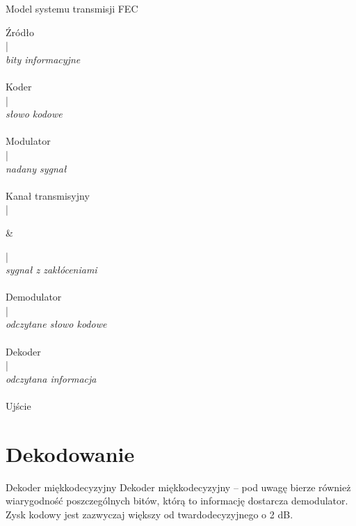 \documentclass[12pt]{beamer}
\begin{document}
\begin{frame}{Model systemu transmisji FEC}
\centering

\begin{minipage}[t]{100pt}{
\centering
Źródło\\|\\ \emph{bity informacyjne}\\ \downarrow\\  Koder\\|\\ \emph{słowo kodowe}\\ \downarrow\\ Modulator\\|\\ \emph{nadany sygnał}\\ \downarrow\\ Kanał transmisyjny\\|\\ }
\end{minipage}
&
\begin{minipage}[t]{100pt}
\centering
|\\
\emph{sygnał z zakłóceniami} \\\downarrow\\
Demodulator\\|\\ \emph{odczytane słowo kodowe}\\ \downarrow\\ Dekoder\\|\\ \emph{odczytana informacja}\\ \downarrow\\ Ujście
\end{minipage}

\end{frame}



\section{Dekodowanie}
\begin{frame}{Dekoder miękkodecyzyjny}
Dekoder miękkodecyzyjny -- pod uwagę bierze również wiarygodność poszczególnych bitów, którą to informację dostarcza demodulator. Zysk kodowy jest zazwyczaj większy od twardodecyzyjnego o 2 dB.
\end{frame}
\end{document}
